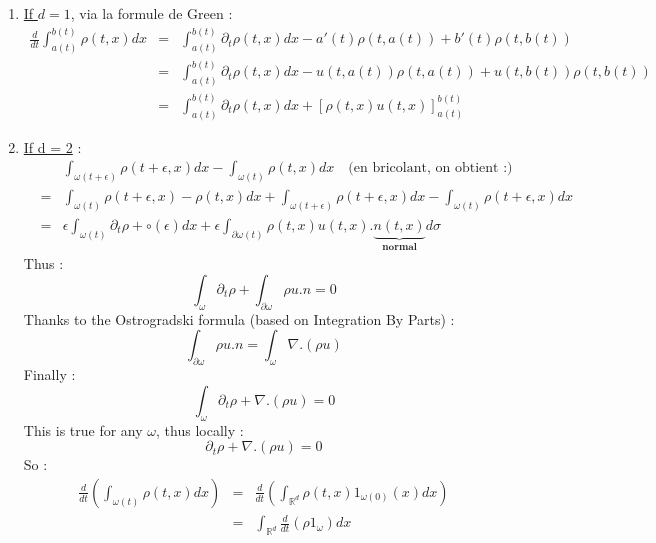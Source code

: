 \documentclass{report}
\theoremstyle{plain}
\theoremstyle{definition}
\theoremstyle{remark}
\begin{document}
\begin{enumerate}
\item \underline{If $d = 1$}, via la formule de Green :
\begin{eqnarray}
\frac{d}{dt}\int_{a(t)}^{b(t)}\rho(t,x)dx &=& \int_{a(t)}^{b(t)}\partial_{t}\rho(t,x)dx - a'(t)\rho(t,a(t)) + b'(t)\rho(t,b(t)) \\
&=& \int_{a(t)}^{b(t)}\partial_{t}\rho(t,x)dx - u(t,a(t))\rho(t,a(t)) + u(t,b(t))\rho(t,b(t)) \\
&=& \int_{a(t)}^{b(t)} \partial_{t}\rho(t,x)dx +  \left[\rho(t,x)u(t,x) \right] _{a(t)}^{b(t)}
\end{eqnarray} 
\item \underline{If d = 2} : 
\begin{eqnarray}
& &\int_{\omega(t+\epsilon)}\rho(t+\epsilon,x)dx - \int_{\omega(t)}\rho(t,x)dx \quad \text{(en bricolant, on obtient :)} \\
&=& \int_{\omega(t)}\rho(t+\epsilon,x)-\rho(t,x)dx + \int_{\omega(t+\epsilon)}\rho(t+\epsilon,x)dx - \int_{\omega(t)}\rho(t+\epsilon,x)dx \\
&=& \epsilon \int_{\omega(t)}\partial_t\rho+ \circ(\epsilon)dx + \epsilon\int_{\partial\omega(t)}\rho(t,x)u(t,x).\underbrace{n(t,x)}_{\textbf{normal}}d\sigma
\end{eqnarray}
Thus : \begin{equation}
\int_{\omega}\partial_t\rho + \int_{\partial\omega}\rho u.n = 0
\end{equation}
Thanks to the Ostrogradski formula (based on Integration By Parts) :
\begin{equation}
\int_{\partial\omega}\rho u.n = \int_{\omega}\nabla.(\rho u)
\end{equation}
Finally : 
\begin{equation}
\int_{\omega}\partial_t\rho + \nabla.(\rho u) = 0
\end{equation}
This is true for any $\omega$, thus locally : \begin{equation}
\partial_t\rho + \nabla.(\rho u) = 0
\end{equation}
So :
\begin{eqnarray}
\frac{d}{dt}\left(\int_{\omega(t)}\rho(t,x)dx\right) &=&  \frac{d}{dt}\left(\int_{\mathbb{R}^d}\rho(t,x)\mathrm{1}_{\omega(0)}(x)dx\right) \\
&=& \int_{\mathbb{R}^d}\frac{d}{dt}\left(\rho \mathrm{1}_{\omega} \right)dx
\end{eqnarray}
\end{enumerate}
 
\end{document}
